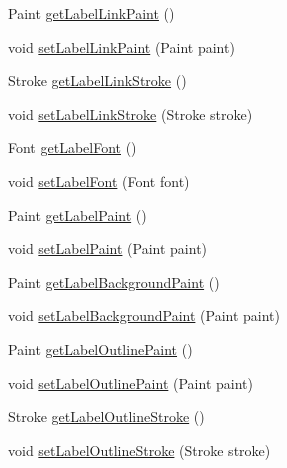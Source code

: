 \begin{DoxyCompactItemize}
\item 
Paint \mbox{\hyperlink{classorg_1_1jfree_1_1chart_1_1plot_1_1_pie_plot_a353bf3cd5156533feab1e40e58a6f64a}{get\+Label\+Link\+Paint}} ()
\item 
void \mbox{\hyperlink{classorg_1_1jfree_1_1chart_1_1plot_1_1_pie_plot_a50d9df69250b68383bf036eb30e396cc}{set\+Label\+Link\+Paint}} (Paint paint)
\item 
Stroke \mbox{\hyperlink{classorg_1_1jfree_1_1chart_1_1plot_1_1_pie_plot_a9b1859596be7e3bf95be63ee3c08134c}{get\+Label\+Link\+Stroke}} ()
\item 
void \mbox{\hyperlink{classorg_1_1jfree_1_1chart_1_1plot_1_1_pie_plot_a763d73175ed86a367237e992dbd3dde6}{set\+Label\+Link\+Stroke}} (Stroke stroke)
\item 
Font \mbox{\hyperlink{classorg_1_1jfree_1_1chart_1_1plot_1_1_pie_plot_aac6ac1fe8df03ac408f23890be3322e8}{get\+Label\+Font}} ()
\item 
void \mbox{\hyperlink{classorg_1_1jfree_1_1chart_1_1plot_1_1_pie_plot_a8c2f0cd7aa743c883a2903d2f46c8e23}{set\+Label\+Font}} (Font font)
\item 
Paint \mbox{\hyperlink{classorg_1_1jfree_1_1chart_1_1plot_1_1_pie_plot_a74d3e481e1a19221ec0609717eed9197}{get\+Label\+Paint}} ()
\item 
void \mbox{\hyperlink{classorg_1_1jfree_1_1chart_1_1plot_1_1_pie_plot_a941a98c8b83cf13669906ec888eb4f83}{set\+Label\+Paint}} (Paint paint)
\item 
Paint \mbox{\hyperlink{classorg_1_1jfree_1_1chart_1_1plot_1_1_pie_plot_a72c8c0c1dd775a541ceee105c9611e7f}{get\+Label\+Background\+Paint}} ()
\item 
void \mbox{\hyperlink{classorg_1_1jfree_1_1chart_1_1plot_1_1_pie_plot_a649f6e9bb10b1b0ce48910e2aae15ed1}{set\+Label\+Background\+Paint}} (Paint paint)
\item 
Paint \mbox{\hyperlink{classorg_1_1jfree_1_1chart_1_1plot_1_1_pie_plot_ad8d6026aa75b647274e8ace856c7769a}{get\+Label\+Outline\+Paint}} ()
\item 
void \mbox{\hyperlink{classorg_1_1jfree_1_1chart_1_1plot_1_1_pie_plot_a16e60b06f3dd0138ff6a81fa8b94c30f}{set\+Label\+Outline\+Paint}} (Paint paint)
\item 
Stroke \mbox{\hyperlink{classorg_1_1jfree_1_1chart_1_1plot_1_1_pie_plot_a5b02eef0fa1268e222786b17e63b4ab9}{get\+Label\+Outline\+Stroke}} ()
\item 
void \mbox{\hyperlink{classorg_1_1jfree_1_1chart_1_1plot_1_1_pie_plot_a394062ead206b4b24ab655a8868bfa5e}{set\+Label\+Outline\+Stroke}} (Stroke stroke)

\end{DoxyCompactItemize}
